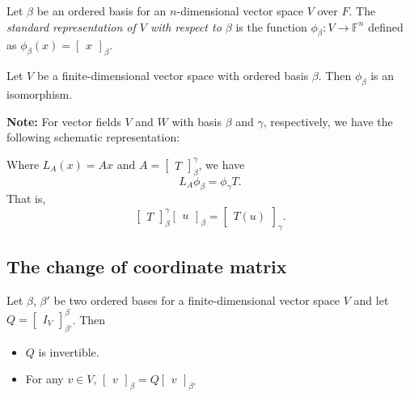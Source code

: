 \documentclass[12pt]{article}
\newenvironment{theorem}[2][Theorem]{\begin{trivlist}
\item[\hskip \labelsep {\bfseries #1}\hskip \labelsep {\bfseries #2.}]}{\end{trivlist}}
\newenvironment{definition}[2][Definition]{\begin{trivlist}
\item[\hskip \labelsep {\bfseries #1}\hskip \labelsep {\bfseries #2}]}{\end{trivlist}}
\begin{document}
\begin{definition}{9}
Let $\beta$ be an ordered basis for an $n$-dimensional vector space $V$ over $F$. The \textit{standard representation of $V$ with respect to $\beta$} is the function $\phi_\beta : V \to \mathbb{F}^n$ defined as $\phi_\beta(x) = \begin{bmatrix} x \end{bmatrix}_\beta$.
\end{definition}

\begin{theorem}{2.21}
Let $V$ be a finite-dimensional vector space with ordered basis $\beta$. Then $\phi_\beta$ is an isomorphism.
\end{theorem}

\noindent\textbf{Note:}
For vector fields $V$ and $W$ with basis $\beta$ and $\gamma$, respectively, we have the following schematic representation:
\begin{center}
\end{center}
Where $L_A(x) = Ax$ and $A = \begin{bmatrix}
T
\end{bmatrix}_\beta^\gamma$, we have $$L_A\phi_\beta = \phi_\gamma T.$$
That is, $$\begin{bmatrix}
T
\end{bmatrix}_\beta^\gamma \begin{bmatrix}
u
\end{bmatrix}_\beta = \begin{bmatrix}
T(u)
\end{bmatrix}_\gamma.$$

\subsection{The change of coordinate matrix}

\begin{theorem}{2.22}
Let $\beta$, $\beta'$ be two ordered bases for a finite-dimensional vector space $V$ and let $Q = \begin{bmatrix} I_V \end{bmatrix}_{\beta'}^\beta$. Then

\begin{itemize}
    \item[(a)] $Q$ is invertible.
    
    \item[(b)] For any $v \in V$, $\begin{bmatrix} v \end{bmatrix}_\beta = Q\begin{bmatrix} v \end{bmatrix}_{\beta'}$
\end{itemize}
\end{theorem}
\end{document}
